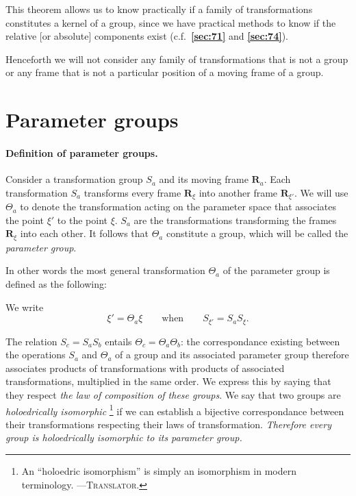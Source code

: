 \documentclass[leqno,11pt]{book}
\numberwithin{equation}{chapter}
\theoremstyle{shape1}
\theoremstyle{shapesmall}
\newcommand{\fsref}[1]{{\rm\textsection\textbf{\ref{sec:#1}}}}
\newcommand{\somespace}{\vspace{9pt}}
\begin{document}
\somespace

This theorem allows us to know practically if a family of transformations constitutes a kernel of a group, since we have practical methods to know if the relative [or absolute] components exist (c.f.~\fsref{71} and \fsref{74}).

Henceforth we will not consider any family of transformations that is not a group or any frame that is not a particular position of a moving frame of a group.

\section{Parameter groups}
\label{sec:parameter-groups}
\paragraph{Definition of parameter groups.}
\label{sec:79}
Consider a transformation group $S_{a}$ and its moving frame $\mathbf{R}_{a}$. Each transformation $S_{a}$ transforms every frame $\mathbf{R}_{\xi}$ into another frame $\mathbf{R}_{\xi'}$. We will use $\Theta_{a}$ to denote the transformation acting on the parameter space that associates the point $\xi'$ to the point $\xi$. $S_{a}$ are the transformations transforming the frames $\mathbf{R}_{\xi}$ into each other. It follows that $\Theta_{a}$ constitute a group, which will be called the \emph{parameter group}.

In other words the most general transformation $\Theta_{a}$ of the parameter group is defined as the following:

We write
\begin{equation}
  \label{eq:5.25}
  \xi'=\Theta_{a}\xi\qquad\text{when}\qquad S_{\xi'}=S_{a}S_{\xi}.
\end{equation}

The relation $S_{c}=S_{a}S_{b}$ entails $\Theta_{c}=\Theta_{a}\Theta_{b}$: the correspondance existing between the operations $S_{a}$ and $\Theta_{a}$ of a group and its associated parameter group therefore associates products of transformations with products of associated transformations, multiplied in the same order. We express this by saying that they respect \emph{the law of composition of these groups}. We say that two groups are \emph{holoedrically isomorphic} \footnote{An ``holoedric isomorphism'' is simply an isomorphism in modern terminology. ---\textsc{Translator}.} if we can establish a bijective correspondance between their transformations respecting their laws of transformation. \emph{Therefore every group is holoedrically isomorphic to its parameter group.}
\end{document}
